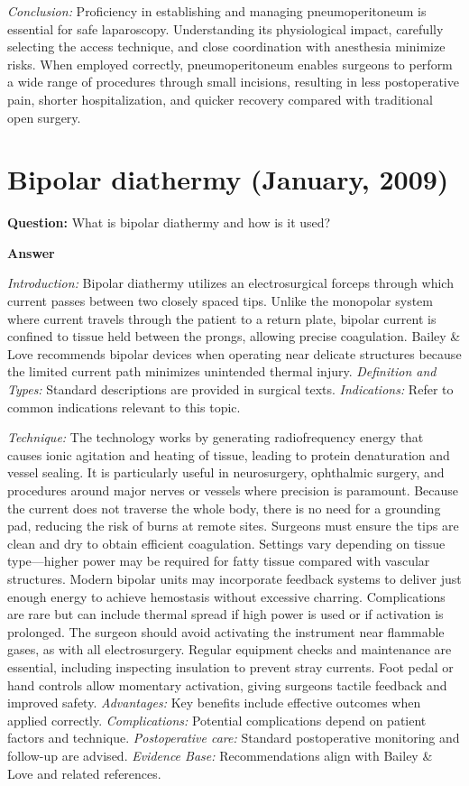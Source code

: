 \documentclass{article}
\begin{document}
\emph{Conclusion:} Proficiency in establishing and managing pneumoperitoneum is essential for safe laparoscopy. Understanding its physiological impact, carefully selecting the access technique, and close coordination with anesthesia minimize risks. When employed correctly, pneumoperitoneum enables surgeons to perform a wide range of procedures through small incisions, resulting in less postoperative pain, shorter hospitalization, and quicker recovery compared with traditional open surgery.


\section{Bipolar diathermy (January, 2009)}

\textbf{Question:} What is bipolar diathermy and how is it used?

\textbf{Answer}

\emph{Introduction:} Bipolar diathermy utilizes an electrosurgical forceps through which current passes between two closely spaced tips. Unlike the monopolar system where current travels through the patient to a return plate, bipolar current is confined to tissue held between the prongs, allowing precise coagulation. Bailey \& Love recommends bipolar devices when operating near delicate structures because the limited current path minimizes unintended thermal injury.
\emph{Definition and Types:} Standard descriptions are provided in surgical texts.
\emph{Indications:} Refer to common indications relevant to this topic.

\emph{Technique:} The technology works by generating radiofrequency energy that causes ionic agitation and heating of tissue, leading to protein denaturation and vessel sealing. It is particularly useful in neurosurgery, ophthalmic surgery, and procedures around major nerves or vessels where precision is paramount. Because the current does not traverse the whole body, there is no need for a grounding pad, reducing the risk of burns at remote sites. Surgeons must ensure the tips are clean and dry to obtain efficient coagulation. Settings vary depending on tissue type—higher power may be required for fatty tissue compared with vascular structures. Modern bipolar units may incorporate feedback systems to deliver just enough energy to achieve hemostasis without excessive charring. Complications are rare but can include thermal spread if high power is used or if activation is prolonged. The surgeon should avoid activating the instrument near flammable gases, as with all electrosurgery. Regular equipment checks and maintenance are essential, including inspecting insulation to prevent stray currents. Foot pedal or hand controls allow momentary activation, giving surgeons tactile feedback and improved safety.
\emph{Advantages:} Key benefits include effective outcomes when applied correctly.
\emph{Complications:} Potential complications depend on patient factors and technique.
\emph{Postoperative care:} Standard postoperative monitoring and follow-up are advised.
\emph{Evidence Base:} Recommendations align with Bailey \& Love and related references.
\end{document}
